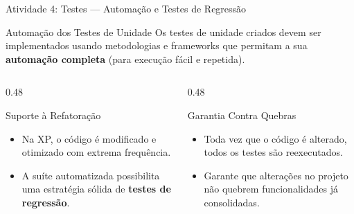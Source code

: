 \documentclass[aspectratio=169, 9pt]{beamer}
\begin{document}
\begin{frame}{Atividade 4: Testes --- Automação e Testes de Regressão}
  \begin{block}{Automação dos Testes de Unidade}
    Os testes de unidade criados devem ser implementados usando metodologias e frameworks que permitam a sua \textbf{automação completa} (para execução fácil e repetida).
  \end{block}

  \vspace{0.3cm}

  \begin{columns}[T]
    \begin{column}{0.48\textwidth}
      \begin{exampleblock}{Suporte à Refatoração}
        \begin{itemize}
          \item Na XP, o código é modificado e otimizado com extrema frequência.
          \item A suíte automatizada possibilita uma estratégia sólida de \textbf{testes de regressão}.
        \end{itemize}
      \end{exampleblock}
    \end{column}

    \begin{column}{0.48\textwidth}
      \begin{alertblock}{Garantia Contra Quebras}
        \begin{itemize}
          \item Toda vez que o código é alterado, todos os testes são reexecutados.
          \item Garante que alterações no projeto não quebrem funcionalidades já consolidadas.
        \end{itemize}
      \end{alertblock}
    \end{column}
  \end{columns}
\end{frame}
\end{document}
